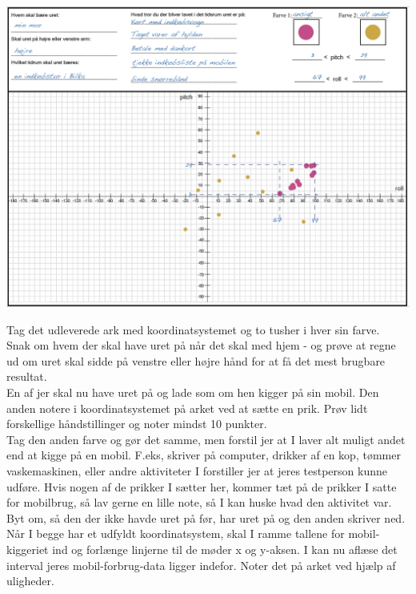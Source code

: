 \documentclass{ucph-handout}
\begin{document}
\begin{exercisebox}[adjusted title=Aflæs koordinaterne]

\includegraphics[width=1\textwidth]{billeder/coronaansigt.png}

Tag det udleverede ark med koordinatsystemet og to tusher i hver sin farve. \\

Snak om hvem der skal have uret på når det skal med hjem - og prøve at regne ud om uret skal sidde på venstre eller højre hånd for at få det mest brugbare resultat. \\

En af jer skal nu have uret på og lade som om hen kigger på sin mobil. Den anden notere i koordinatsystemet på arket ved at sætte en prik. Prøv lidt forskellige håndstillinger og noter mindst 10 punkter.\\

Tag den anden farve og gør det samme, men forstil jer at I laver alt muligt andet end at kigge på en mobil. F.eks, skriver på computer, drikker af en kop, tømmer vaskemaskinen, eller andre aktiviteter I forstiller jer at jeres testperson kunne udføre. Hvis nogen af de prikker I sætter her, kommer tæt på de prikker I satte for mobilbrug, så lav gerne en lille note, så I kan huske hvad den aktivitet var. \\

Byt om, så den der ikke havde uret på før, har uret på og den anden skriver ned. \\ 

Når I begge har et udfyldt koordinatsystem, skal I ramme tallene for mobil-kiggeriet ind og forlænge linjerne til de møder x og y-aksen. I kan nu aflæse det interval jeres mobil-forbrug-data ligger indefor. Noter det på arket ved hjælp af uligheder.  

\end{exercisebox}
\end{document}
